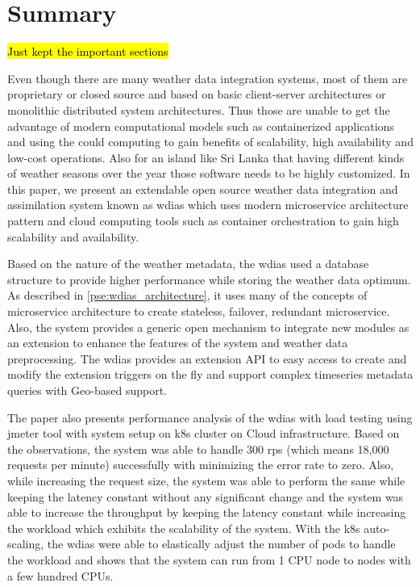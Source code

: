 \documentclass[conference]{IEEEtran}
\newcommand{\dbc}[1]{\todo[author=Dilum, inline, color=blue!40]{#1}}
\begin{document}
\section{Summary}
\label{pse:summary}
\dbc{Summary is too long. Should not be more than a single para}
\hl{Just kept the important sections}

Even though there are many weather data integration systems, most of them are proprietary or closed source and based on basic client-server architectures or monolithic distributed system architectures. Thus those are unable to get the advantage of modern computational models such as containerized applications and using the could computing to gain benefits of scalability, high availability and low-cost operations.
Also for an island like Sri Lanka that having different kinds of weather seasons over the year those software needs to be highly customized. In this paper, we present an extendable open source weather data integration and assimilation system known as \acrshort{wdias} which uses modern microservice architecture pattern and cloud computing tools such as container orchestration to gain high scalability and availability.

Based on the nature of the weather metadata, the \acrshort{wdias} used a database structure to provide higher performance while storing the weather data optimum.
As described in \cref{pse:wdias_architecture}, it uses many of the concepts of microservice architecture to create stateless, failover, redundant microservice. Also, the system provides a generic open mechanism to integrate new modules as an extension to enhance the features of the system and weather data preprocessing. The \acrshort{wdias} provides an extension API to easy access to create and modify the extension triggers on the fly and support complex timeseries metadata queries with Geo-based support.

The paper also presents performance analysis of the \acrshort{wdias} with load testing using \acrshort{jmeter} tool with system setup on \acrfull{k8s} cluster on Cloud infrastructure. Based on the observations, the system was able to handle 300 \acrshort{rps} (which means 18,000 requests per minute) successfully with minimizing the error rate to zero. Also, while increasing the request size, the system was able to perform the same while keeping the latency constant without any significant change and the system was able to increase the throughput by keeping the latency constant while increasing the workload which exhibits the scalability of the system.
With the \acrshort{k8s} auto-scaling, the \acrshort{wdias} were able to elastically adjust the number of pods to handle the workload and shows that the system can run from 1 CPU node to nodes with a few hundred CPUs.
\end{document}
